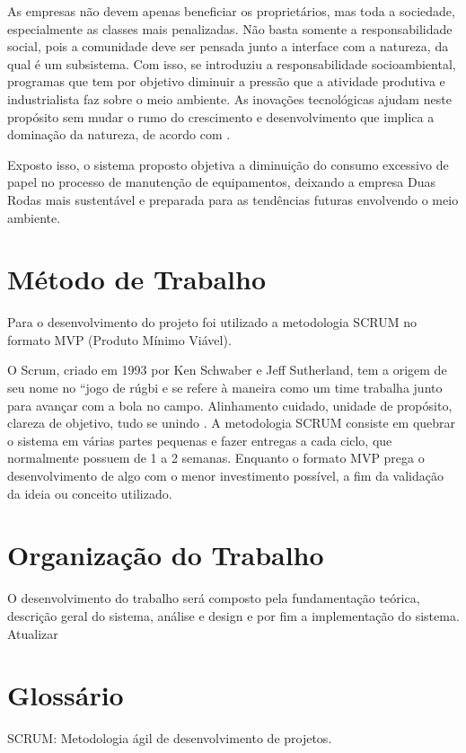 As empresas não devem apenas beneficiar os proprietários, mas toda a sociedade, especialmente as classes mais penalizadas. Não basta somente a responsabilidade social, pois a comunidade deve ser pensada junto a interface com a natureza, da qual é um subsistema. Com isso, se introduziu a responsabilidade socioambiental, programas que tem por objetivo diminuir a pressão que a atividade produtiva e industrialista faz sobre o meio ambiente. As inovações tecnológicas ajudam neste propósito sem mudar o rumo do crescimento e desenvolvimento que implica a dominação da natureza, de acordo com \cite{boff2017sustentabilidade}.

Exposto isso, o sistema proposto objetiva a diminuição do consumo excessivo de papel no processo de manutenção de equipamentos, deixando a empresa Duas Rodas mais sustentável e preparada para as tendências futuras envolvendo o meio ambiente.

\section{Método de Trabalho}
Para o desenvolvimento do projeto foi utilizado a metodologia SCRUM no formato MVP (Produto Mínimo Viável).

O Scrum, criado em 1993 por Ken Schwaber e Jeff Sutherland, tem a origem de seu nome no “jogo de rúgbi e se refere à maneira como um time trabalha junto para avançar com a bola no campo. Alinhamento cuidado, unidade de propósito, clareza de objetivo, tudo se unindo \cite{rocha2015metodologia}.
A metodologia SCRUM consiste em quebrar o sistema em várias partes pequenas e fazer entregas a cada ciclo, que normalmente possuem de 1 a 2 semanas.
Enquanto o formato MVP prega o desenvolvimento de algo com o menor investimento possível, a fim da validação da ideia ou conceito utilizado.

\section{Organização do Trabalho}

O desenvolvimento do trabalho será composto pela fundamentação teórica, descrição geral do sistema, análise e design e por fim a implementação do sistema.
{\color{red} Atualizar}
\section{Glossário}
SCRUM:		Metodologia ágil de desenvolvimento de projetos.

